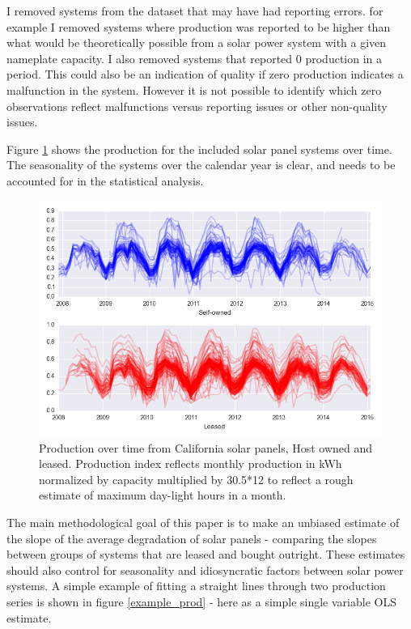 \documentclass[12pt]{article}
\begin{document}
I removed systems from the dataset that may have had reporting errors. for example I removed systems where production was reported to be higher than what would be theoretically possible from a solar power system with a given nameplate capacity. I also removed systems that reported 0 production in a period. This could also be an indication of quality if zero production indicates a malfunction in the system. However it is not possible to identify which zero observations reflect malfunctions versus reporting issues or other non-quality issues.

Figure \ref{tot_production} shows the production for the included solar panel systems over time. The seasonality of the systems over the calendar year is clear, and needs to be accounted for in the statistical analysis.

\begin{figure}
	\includegraphics[width=1\textwidth]{tot_production.png}
	\caption{Production over time from California solar panels, Host owned and leased. Production index reflects monthly production in kWh normalized by capacity multiplied by 30.5*12 to reflect a rough estimate of maximum day-light hours in a month.}
	\label{tot_production}
\end{figure}

The main methodological goal of this paper is to make an unbiased estimate of the slope of the average degradation of solar panels - comparing the slopes between groups of systems that are leased and bought outright. These estimates should also control for seasonality and idiosyncratic factors between solar power systems.
A simple example of fitting a straight lines through two production series is shown in figure \ref{example_prod} - here as a simple single variable OLS estimate.
\end{document}
